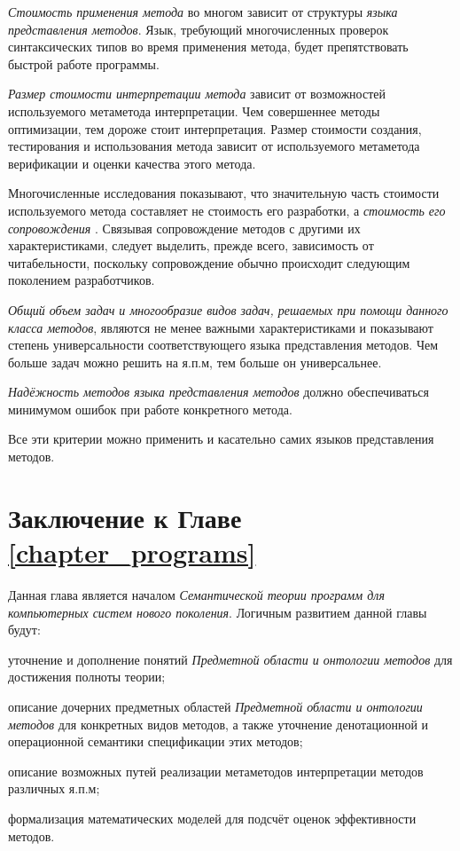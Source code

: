 \textit{Стоимость применения метода} во многом зависит от структуры \textit{языка представления методов}. Язык, требующий многочисленных проверок синтаксических типов во время применения метода, будет препятствовать быстрой работе программы.

\textit{Размер стоимости интерпретации метода} зависит от возможностей используемого метаметода интерпретации. Чем совершеннее методы оптимизации, тем дороже стоит интерпретация.
Размер стоимости создания, тестирования и использования метода зависит от используемого метаметода верификации и оценки качества этого метода.

Многочисленные исследования показывают, что значительную часть стоимости используемого метода составляет не стоимость его разработки, а \textit{стоимость его сопровождения} \cite{Brooks2021}. Связывая сопровождение методов с другими их характеристиками, следует выделить, прежде всего, зависимость от читабельности, поскольку сопровождение обычно происходит следующим поколением разработчиков.

\textit{Общий объем задач и многообразие видов задач, решаемых при помощи данного класса методов}, являются не менее важными характеристиками и показывают степень универсальности соответствующего языка представления методов. Чем больше задач можно решить на я.п.м, тем больше он универсальнее.

\textit{Надёжность методов языка представления методов} должно обеспечиваться минимумом ошибок при работе конкретного метода.

Все эти критерии можно применить и касательно самих языков представления методов.

\section*{Заключение к Главе \ref{chapter_programs}}

Данная глава является началом \textit{Семантической теории программ для компьютерных систем нового поколения}. Логичным развитием данной главы будут:

\begin{textitemize}
    \item уточнение и дополнение понятий \textit{Предметной области и онтологии методов} для достижения полноты теории;
    \item описание дочерних предметных областей \textit{Предметной области и онтологии методов} для конкретных видов методов, а также уточнение денотационной и операционной семантики спецификации этих методов;
    \item описание возможных путей реализации метаметодов интерпретации методов различных я.п.м;
    \item формализация математических моделей для подсчёт оценок эффективности методов.
\end{textitemize}
